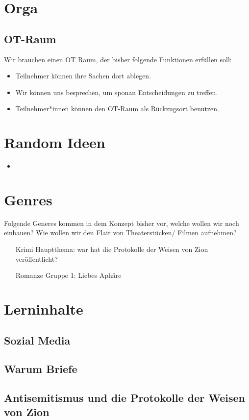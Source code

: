 \documentclass[12pt, a4paper, openany]{report}
\begin{document}
\chapter{Orga}

\section{OT-Raum}
Wir brauchen einen OT Raum, der bisher folgende Funktionen erfüllen soll:
\begin{itemize}
    \item Teilnehmer können ihre Sachen dort ablegen.
    \item Wir können uns besprechen, um sponan Entscheidungen zu treffen.
    \item Teilnehmer*innen können den OT-Raum als Rückzugsort benutzen. 
\end{itemize}

\chapter{Random Ideen}
\begin{itemize}
    \item 
\end{itemize}
\chapter{Genres}
Folgende Generes kommen in dem Konzept bisher vor, welche wollen wir noch einbauen? 
Wie wollen wir den Flair von Theaterstücken/ Filmen aufnehmen?
\begin{itemize}
    \item[Krimi] Hauptthema: war hat die Protokolle der Weisen von Zion veröffentlicht?
    \item[Romanze] Gruppe 1: Liebes Aphäre
\end{itemize}

\chapter{Lerninhalte}
\section{Sozial Media}
\section{Warum Briefe}
\section{Antisemitismus und die Protokolle der Weisen von Zion}

\printbibliography
\listoftodos
\end{document}
